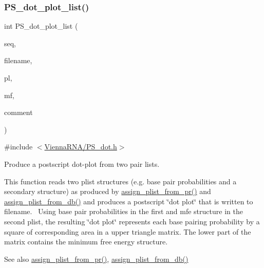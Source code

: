 \subsubsection{\texorpdfstring{P\+S\+\_\+dot\+\_\+plot\+\_\+list()}{PS\_dot\_plot\_list()}}
{\footnotesize\ttfamily int P\+S\+\_\+dot\+\_\+plot\+\_\+list (\begin{DoxyParamCaption}\item[{char $\ast$}]{seq,  }\item[{char $\ast$}]{filename,  }\item[{\mbox{\hyperlink{group__data__structures_ga9608eed021ebfbdd7a901cfdc446c8e9}{plist}} $\ast$}]{pl,  }\item[{\mbox{\hyperlink{group__data__structures_ga9608eed021ebfbdd7a901cfdc446c8e9}{plist}} $\ast$}]{mf,  }\item[{char $\ast$}]{comment }\end{DoxyParamCaption})}



{\ttfamily \#include $<$\mbox{\hyperlink{_p_s__dot_8h}{Vienna\+R\+N\+A/\+P\+S\+\_\+dot.\+h}}$>$}



Produce a postscript dot-\/plot from two pair lists. 

This function reads two plist structures (e.\+g. base pair probabilities and a secondary structure) as produced by \mbox{\hyperlink{group__pf__fold_ga1cc05aaa9b0e7df2d3887e98321c2030}{assign\+\_\+plist\+\_\+from\+\_\+pr()}} and \mbox{\hyperlink{group__struct__utils_gab61df77cf7949cd516181fce0c3d7d78}{assign\+\_\+plist\+\_\+from\+\_\+db()}} and produces a postscript \char`\"{}dot plot\char`\"{} that is written to \textquotesingle{}filename\textquotesingle{}.~\newline
Using base pair probabilities in the first and mfe structure in the second plist, the resulting \char`\"{}dot plot\char`\"{} represents each base pairing probability by a square of corresponding area in a upper triangle matrix. The lower part of the matrix contains the minimum free energy structure.

\begin{DoxySeeAlso}{See also}
\mbox{\hyperlink{group__pf__fold_ga1cc05aaa9b0e7df2d3887e98321c2030}{assign\+\_\+plist\+\_\+from\+\_\+pr()}}, \mbox{\hyperlink{group__struct__utils_gab61df77cf7949cd516181fce0c3d7d78}{assign\+\_\+plist\+\_\+from\+\_\+db()}}
\end{DoxySeeAlso}

